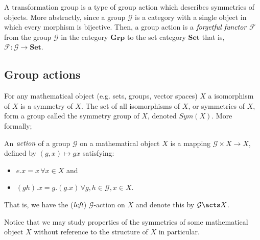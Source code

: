 A transformation group is a type of group action which describes symmetries of objects. More abstractly,
since a group $\mathcal{G}$ is a category with a single object in which every morphism is bijective.
Then, a group action is a $\emph{forgetful functor}$ $\mathcal{F}$ from the group $\mathcal{G}$ in the category $\textbf{Grp}$
to the set category $\textbf{Set}$ that is, $\mathcal{F} : \mathcal{G} \to \textbf{Set}$.

\subsection{Group actions} %
\label{subsec:groupaction}

For any mathematical object (e.g. sets, groups, vector spaces) $X$ a isomorphism
of $X$ is a symmetry of $X$. The set of all isomorphisms of $X$, or symmetries
of $X$, form a group called the symmetry group of $X$, denoted $Sym(X)$.
More formally;

\begin{defn}
	An $\emph{action}$ of a group $\mathcal{G}$ on a mathematical object $X$ is
	a mapping $\mathcal{G} \times X \to X$, defined by $(g,x) \mapsto g \dot x$
	satisfying:
	\begin{itemize}
			\item $e . x = x \, \forall x \in X$ and
			\item $(g h) . x = g . (g . x) \, \forall g,h \in \mathcal{G}, x \in X$.
	\end{itemize}
	That is, we have the ($\emph{left}$) $\mathcal{G}$-action on $X$ and denote this
	by $\mathcal{G} \acts X$.
\end{defn}

Notice that we may study properties of the symmetries of some mathematical object $X$
without reference to the structure of $X$ in particular.

